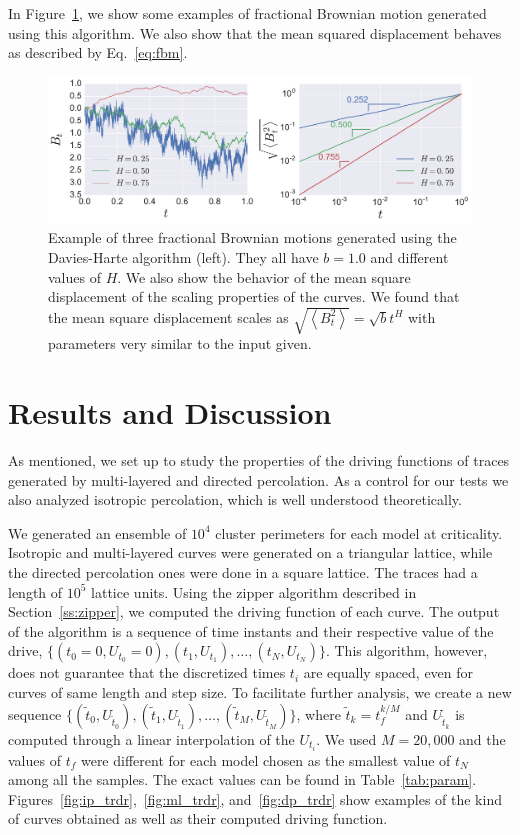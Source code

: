 In Figure~\ref{fig:fbm}, we show some examples of fractional Brownian motion
generated using this algorithm. We also show that the mean squared displacement
behaves as described by Eq.~\ref{eq:fbm}.

\begin{figure}
\begin{center}
    \includegraphics[scale=0.45]{chapters/ch6-asle/figs/fbm}
\end{center}
\caption{Example of three fractional Brownian motions generated using the
    Davies-Harte algorithm (left). They all have $b=1.0$ and different values
    of $H$. We also show the behavior of the mean square displacement of the
    scaling properties of the curves. We found that the mean square displacement
    scales as $\sqrt{\left\langle B_t^2\right\rangle}=\sqrt{b}t^H$ with
    parameters very similar to the input given.}
\label{fig:fbm}
\end{figure}


\section{Results and Discussion}
\label{sec:scaling}

As mentioned, we set up to study the properties of the driving functions of
traces generated by multi-layered and directed percolation. As a control for
our tests we also analyzed isotropic percolation, which is well understood
theoretically.

We generated an ensemble of $10^4$ cluster perimeters for each model at
criticality. Isotropic and multi-layered curves were generated on a triangular
lattice, while the directed percolation ones were done in a square lattice. The
traces had a length of $10^5$ lattice units. Using the zipper algorithm
described in Section~\ref{ss:zipper}, we computed the driving function of each
curve. The output of the algorithm is a sequence of time instants and their
respective value of the drive, $\{(t_0=0, U_{t_0}=0), (t_1, U_{t_1}), \ldots,
(t_N, U_{t_N})\}$. This algorithm, however, does not guarantee that the
discretized times $t_i$ are equally spaced, even for curves of same length and
step size. To facilitate further analysis, we create a new sequence
$\{(\tilde{t}_{0}, U_{\tilde{t}_{0}}), (\tilde{t}_{1}, U_{\tilde{t}_{1}}),
\ldots, (\tilde{t}_{M}, U_{\tilde{t}_{M}})\}$, where $\tilde{t}_k = t_f^{k/M}$
and $U_{\tilde{t}_k}$ is computed through a linear interpolation of the
$U_{t_i}$. We used $M=20,000$ and the values of $t_f$ were different for each
model chosen as the smallest value of $t_N$ among all the samples. The exact
values can be found in Table~\ref{tab:param}.
Figures~\ref{fig:ip_trdr},~\ref{fig:ml_trdr}, and~\ref{fig:dp_trdr} show
examples of the kind of curves obtained as well as their computed driving
function.

